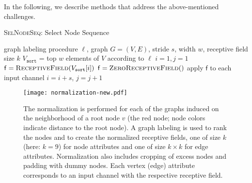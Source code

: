 \documentclass{article}
\begin{document}
In the following, we describe methods that address the above-mentioned challenges. 

























\begin{algorithm}[t!]
  \small
   \caption{\textsc{SelNodeSeq}: Select Node Sequence}
   \label{alg:sequence}
\begin{algorithmic}[1]
    graph labeling procedure $\ell$, graph $G=(V, E)$, stride $s$, width $w$, receptive field size $k$
   \STATE $V_{\mathtt{sort}}$ = top $w$ elements of $V$ according to $\ell$
   \STATE $i=1, j=1$
   \STATE $\mathsf{f} = \textsc{ReceptiveField}(V_{\mathtt{sort}}[i])$
   \ELSE
   \STATE $\mathsf{f} = \textsc{ZeroReceptiveField}()$
   \ENDIF
   \STATE apply $\mathsf{f}$ to each input channel
   \STATE $i = i + s$, $j = j + 1$
   \ENDWHILE
\end{algorithmic}
\end{algorithm}
\vspace{-1mm}




\begin{figure*}
\centering
\texttt{[image: normalization-new.pdf]}
\vspace{-1.6mm}
\caption{\label{fig-normalize} The normalization is performed for each of the graphs induced on the neighborhood of a root node $v$ (the red node; node colors indicate distance to the root node). A graph labeling is used to rank the nodes and to create the normalized receptive fields, one of size $k$ (here: $k=9$) for node attributes and one of size $k\times k$ for edge attributes. Normalization also includes cropping of excess nodes and padding with dummy nodes. Each vertex (edge) attribute corresponds to an input channel with the respective receptive field.}
\end{figure*}
\end{document}

